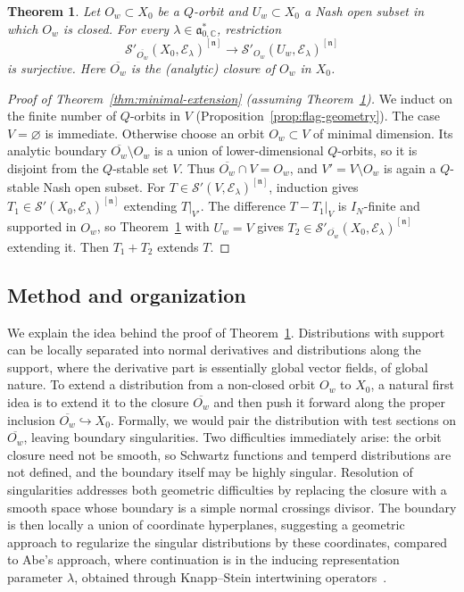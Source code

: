 \documentclass[a4paper,12pt]{amsart}
\numberwithin{equation}{section}
\newtheorem{maintheorem}{Theorem}
\theoremstyle{definition}
\theoremstyle{remark}
\newcommand{\C}{\mathbb C}
\newcommand{\fn}{\mathfrak n}
\newcommand{\fa}{\mathfrak a}
\newcommand{\IN}{I_N}
\newcommand{\mcS}{\mathcal S}
\newcommand{\mcE}{\mathcal E}
\begin{document}
\begin{maintheorem}\label{thm:supported-extension}
Let $O_w\subset X_0$ be a $Q$-orbit and $U_w\subset X_0$ a Nash open subset in which $O_w$ is closed. For every $\lambda\in\fa_{0,\C}^*$, restriction
\[
 \mcS'_{\overline{O_w}}(X_0,\mcE_\lambda)^{[\fn]}\longrightarrow\mcS'_{O_w}(U_w,\mcE_\lambda)^{[\fn]}
\]
is surjective. Here $\overline{O_w}$ is the (analytic) closure of $O_w$ in $X_0$.
\end{maintheorem}

\begin{proof}[Proof of Theorem~\ref{thm:minimal-extension} (assuming Theorem~\ref{thm:supported-extension})]
We induct on the finite number of $Q$-orbits in $V$ (Proposition~\ref{prop:flag-geometry}). The case $V=\varnothing$ is immediate. Otherwise choose an orbit $O_w\subset V$ of minimal dimension. Its analytic boundary $\overline{O_w}\setminus O_w$ is a union of lower-dimensional $Q$-orbits, so it is disjoint from the $Q$-stable set $V$. Thus $\overline{O_w}\cap V=O_w$, and $V'=V\setminus O_w$ is again a $Q$-stable Nash open subset. For $T\in\mcS'(V,\mcE_\lambda)^{[\fn]}$, induction gives $T_1\in\mcS'(X_0,\mcE_\lambda)^{[\fn]}$ extending $T|_{V'}$. The difference $T-T_1|_V$ is $\IN$-finite and supported in $O_w$, so Theorem~\ref{thm:supported-extension} with $U_w=V$ gives $T_2\in\mcS'_{\overline{O_w}}(X_0,\mcE_\lambda)^{[\fn]}$ extending it. Then $T_1+T_2$ extends $T$.
\end{proof}

\subsection{Method and organization}\label{ssec:organization}

We explain the idea behind the proof of Theorem~\ref{thm:supported-extension}. Distributions with support can be locally separated into normal derivatives and distributions along the support, where the derivative part is essentially global vector fields, of global nature.
To extend a distribution from a non-closed orbit $O_w$ to $X_0$, a natural first idea is to extend it to the closure $\overline{O_w}$ and then push it forward along the proper inclusion $\overline{O_w}\hookrightarrow X_0$. Formally, we would pair the distribution with test sections on $\overline{O_w}$, leaving boundary singularities. Two difficulties immediately arise: the orbit closure need not be smooth, so Schwartz functions and temperd distributions are not defined, and the boundary itself may be highly singular. Resolution of singularities addresses both geometric difficulties by replacing the closure with a smooth space whose boundary is a simple normal crossings divisor. The boundary is then locally a union of coordinate hyperplanes, suggesting a geometric approach to regularize the singular distributions by these coordinates, compared to Abe's approach, where continuation is in the inducing representation parameter $\lambda$, obtained through Knapp--Stein intertwining operators~\cite[Proposition~4.4]{Abe12}.
\end{document}
